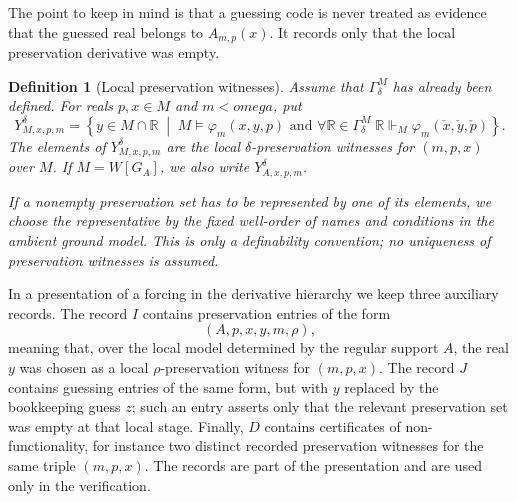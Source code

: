 \documentclass{article}
\newtheorem{definition}[theorem]{Definition}
\theoremstyle{remark}
\theoremstyle{plain}
\newcommand{\forceR}{\mathbb{R}}
\newcommand{\Real}{\mathbb{R}}
\def\omega{omega}%
\begin{document}
The point to keep in mind is that a guessing code is never treated as evidence
that the guessed real belongs to $A_{m,p}(x)$. It records only that the local
preservation derivative was empty.


\begin{definition}[Local preservation witnesses]\label{def:local-witnesses}
Assume that $\Gamma^M_\delta$ has already been defined. For reals
$p,x\in M$ and $m<\omega$, put
\[
   Y^\delta_{M,x,p,m}
   =
   \left\{y\in M\cap\Real\;\middle|\;
   M\models \varphi_m(x,y,p)
   \text{ and }
   \forall \forceR\in\Gamma^M_\delta\;
      \forceR\Vdash_M \varphi_m(\check x,\check y,\check p)
   \right\}.
\]
The elements of $Y^\delta_{M,x,p,m}$ are the local
$\delta$-preservation witnesses for $(m,p,x)$ over $M$. If
$M=W[G_A]$, we also write $Y^\delta_{A,x,p,m}$.

If a nonempty preservation set has to be represented by one of its elements, we
choose the representative by the fixed well-order of names and conditions in the
ambient ground model. This is only a definability convention; no uniqueness of
preservation witnesses is assumed.
\end{definition}

In a presentation of a forcing in the derivative hierarchy we keep three
auxiliary records. The record $I$ contains preservation entries of the form
\[
   (A,p,x,y,m,\rho),
\]
meaning that, over the local model determined by the regular support $A$, the
real $y$ was chosen as a local $\rho$-preservation witness for $(m,p,x)$. The
record $J$ contains guessing entries of the same form, but with $y$ replaced by
the bookkeeping guess $z$; such an entry asserts only that the relevant
preservation set was empty at that local stage. Finally, $D$ contains
certificates of non-functionality, for instance two distinct recorded
preservation witnesses for the same triple $(m,p,x)$. The records are part of
the presentation and are used only in the verification.
\end{document}
